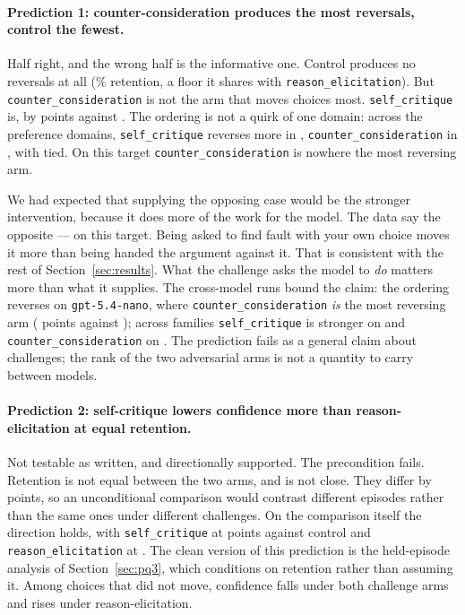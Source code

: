 \paragraph{Prediction 1: counter-consideration produces the most reversals, control the
fewest.} Half right, and the wrong half is the informative one. Control produces no
reversals at all (\pqxeRetCtl{}\% retention, a floor it shares with
\texttt{reason\_elicitation}). But \texttt{counter\_consideration} is
not the arm that moves choices most. \texttt{self\_critique} is, by \pqxeDiffCritique{}
points against \pqxeDiffCounter{}. The ordering is not a quirk of one domain: across the
\pqxPredOneOf{} preference domains, \texttt{self\_critique} reverses more in
\pqxPredOneDoms{}, \texttt{counter\_consideration} in \pqxPredOneCounterMore{}, with
\pqxPredOneTied{} tied. On this target \texttt{counter\_consideration} is nowhere the
most reversing arm.

We had expected that supplying the opposing case would be the stronger intervention,
because it does more of the work for the model. The data say the opposite --- on this
target. Being asked to
find fault with your own choice moves it more than being handed the argument against it.
That is consistent with the rest of Section~\ref{sec:results}. What the challenge asks the
model to \emph{do} matters more than what it supplies. The cross-model runs bound the
claim: the ordering reverses on \texttt{gpt-5.4-nano}, where
\texttt{counter\_consideration} \emph{is} the most reversing arm (\xmNanoDiffCounter{}
points against \xmNanoDiffCritique{}); across \xmNTargets{} families
\texttt{self\_critique} is stronger on \xmCritiqueWins{} and
\texttt{counter\_consideration} on \xmCounterWins{}. The prediction fails as a general
claim about challenges; the rank of the two adversarial arms is not a quantity to carry
between models.

\paragraph{Prediction 2: self-critique lowers confidence more than reason-elicitation at
equal retention.} Not testable as written, and directionally supported. The precondition
fails. Retention is not equal between the two arms, and is not close. They differ by
\pqxPredTwoRetGap{} points, so an unconditional comparison would contrast different
episodes rather than the same ones under different challenges. On the comparison itself the
direction holds, with \texttt{self\_critique} at \pqxeConfCritique{} points against control
and \texttt{reason\_elicitation} at \pqxeConfReason{}. The clean version of this prediction
is the held-episode analysis of Section~\ref{sec:pq3}, which conditions on retention rather
than assuming it. Among choices that did not move, confidence falls under both challenge
arms and rises under reason-elicitation.

